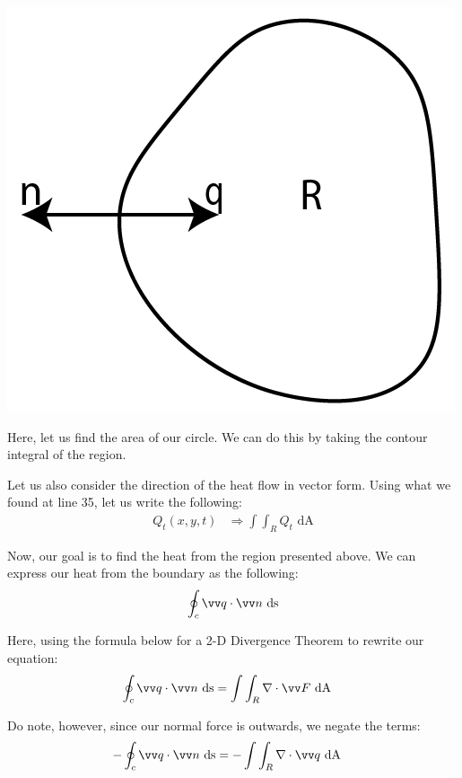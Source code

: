 \documentclass{article}
\begin{document}
\begin{enumerate}
\begin{enumerate}
    \begin{center}
      \includegraphics{p2p2}
    \end{center}

    Here, let us find the area of our circle. We can do this by taking the contour integral of the region.

    Let us also consider the direction of the heat flow in vector form. Using what we found at line 35, let us write the following:
%
    \begin{align}
      Q_t(x, y, t) & \Rightarrow \int \int_R Q_t \text{ dA}
    \end{align}

  Now, our goal is to find the heat from the region presented above. We can express our heat from the boundary as the following:
%
  \begin{align}
    \oint_c \vv q \cdot \vv n \text{ ds}
  \end{align}

  Here, using the formula below for a 2-D Divergence Theorem to rewrite our equation:
%
  \begin{align}
    \oint_c \vv q \cdot \vv n \text{ ds} & =
    \int \int_R \grad \cdot \vv F \text{ dA}
  \end{align}

  Do note, however, since our normal force is outwards, we negate the terms:
%
  \begin{align}
      -\oint_c \vv q \cdot \vv n \text{ ds} & = -
      \int \int_R \grad \cdot \vv q \text{ dA}
  \end{align}


\end{enumerate}
\end{enumerate}
\end{document}
